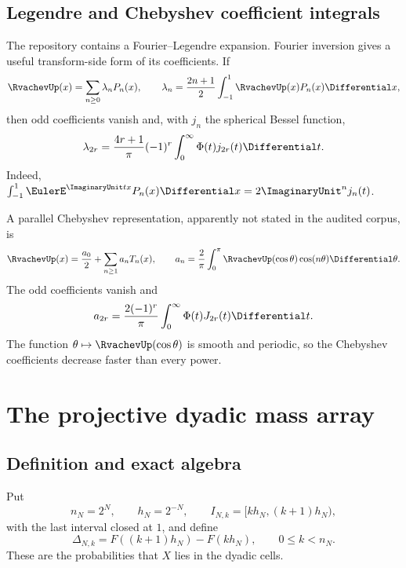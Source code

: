 \documentclass[11pt]{article}
\theoremstyle{definition}
\theoremstyle{remark}
\begin{document}
\subsection{Legendre and Chebyshev coefficient integrals}

The repository contains a Fourier--Legendre expansion.  Fourier inversion gives
a useful transform-side form of its coefficients.  If
\begin{equation}\label{p3:eq:Legendre-expansion}
 \RvachevUp(x)=\sum_{n\ge0}\lambda_nP_n(x),
 \qquad
 \lambda_n=\frac{2n+1}{2}\int_{-1}^1\RvachevUp(x)P_n(x)\Differential x,
\end{equation}
then odd coefficients vanish and, with $j_n$ the spherical Bessel function,
\begin{equation}\label{p3:eq:Legendre-Bessel}
 \lambda_{2r}=\frac{4r+1}{\pi}(-1)^r
 \int_0^\infty\Phi(t)j_{2r}(t)\Differential t.
\end{equation}
Indeed,
$\int_{-1}^1\EulerE^{\ImaginaryUnit tx}P_n(x)\Differential x=2\ImaginaryUnit^n j_n(t)$.

A parallel Chebyshev representation, apparently not stated in the audited
corpus, is
\begin{equation}\label{p3:eq:Chebyshev-expansion}
 \RvachevUp(x)=\frac{a_0}{2}+\sum_{n\ge1}a_nT_n(x),
 \qquad
 a_n=\frac2\pi\int_0^\pi\RvachevUp(\cos\theta)\cos(n\theta)\Differential\theta.
\end{equation}
The odd coefficients vanish and
\begin{equation}\label{p3:eq:Chebyshev-Bessel}
 a_{2r}=\frac{2(-1)^r}{\pi}
 \int_0^\infty\Phi(t)J_{2r}(t)\Differential t.
\end{equation}
The function $\theta\mapsto\RvachevUp(\cos\theta)$ is smooth and periodic, so the
Chebyshev coefficients decrease faster than every power.

\section{The projective dyadic mass array}
\label{p3:sec:dyadic-masses}

\subsection{Definition and exact algebra}

Put
\begin{equation}\label{p3:eq:nN-hN}
 n_N=2^N,
 \qquad h_N=2^{-N},
 \qquad I_{N,k}=[kh_N,(k+1)h_N),
\end{equation}
with the last interval closed at $1$, and define
\begin{equation}\label{p3:eq:Delta-def}
 \Delta_{N,k}
 =F((k+1)h_N)-F(kh_N),
 \qquad 0\le k<n_N.
\end{equation}
These are the probabilities that $X$ lies in the dyadic cells.
\end{document}
